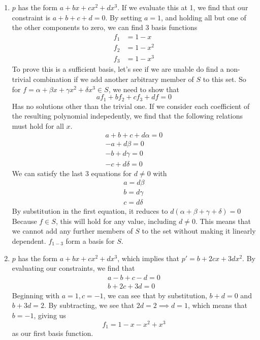 \documentclass[]{article}
\begin{document}
\begin{enumerate}[resume]
\begin{enumerate}
      \item $p$ has the form $a + bx + cx^2 + dx^3$. If we evaluate
        this at 1, we find that our constraint is $a + b + c + d =
        0$. By setting $a = 1$, and holding all but one of the other
        components to zero, we can find 3 basis functions
        \[\begin{split}
        f_1 &= 1 - x \\
        f_2 &= 1 - x^2 \\
        f_3 &= 1 - x^3
        \end{split}\]
        To prove this is a sufficient basis, let's see if we are
        unable do find a non-trivial combination if we add another
        arbitrary member of $S$ to this set. So for $f = \alpha +
        \beta x + \gamma x^2 + \delta x^3 \in S$, we need to show that
        \[
        a f_1 + b f_2 + c f_3 + d f = 0
        \]
        Has no solutions other than the trivial one. If we consider
        each coefficient of the resulting polynomial indepedently, we
        find that the following relations must hold for all $x$.
        \begin{gather*}
          a + b + c + d \alpha = 0 \\
          -a + d \beta = 0 \\
          -b + d \gamma = 0 \\
          -c + d \delta = 0
        \end{gather*}
        We can satisfy the last 3 equations for $d \neq 0$ with
        \begin{gather*}
          a  = d \beta \\
          b  = d \gamma \\
          c  = d \delta
        \end{gather*}
        By substitution in the first equation, it reduces to $d
        (\alpha + \beta + \gamma + \delta) = 0$ Because $f \in S$,
        this will hold for any value, including $d \neq 0$. This means
        that we cannot add any further members of $S$ to the set
        without making it linearly dependent. $f_{1-3}$ form a basis
        for $S$.
        
	  \item $p$ has the form $a + bx + cx^2 + dx^3$, which implies
        that $p' = b + 2cx + 3dx^2$. By evaluating our constraints, we
        find that
        \begin{gather*}
          a - b + c - d = 0 \\
          b + 2c + 3d = 0
        \end{gather*}
        Beginning with $a = 1, c = -1$, we can see that by
        substitution, $b + d = 0$ and $b + 3d = 2$. By subtracting, we
        see that $2d = 2 \implies d = 1$, which means that $b = -1$,
        giving us
        \[
        f_1 = 1 - x - x^2 + x^3
        \]
        as our first basis function.


\end{enumerate}
\end{enumerate}
\end{document}
